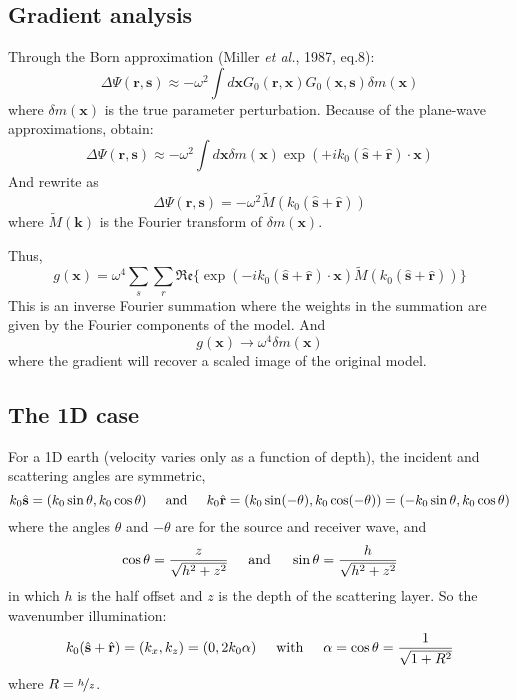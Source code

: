 \documentclass{article}
\newcommand{\mbf}[1]{\mathbf{#1}}
\newcommand{\myRe}{\mathfrak{Re}}
\newcommand{\etal}{\textit{et al.}}
\begin{document}
\subsection{Gradient analysis}
Through the Born approximation (Miller \etal, 1987, eq.8):
\[ \Delta\Psi(\mbf r,\mbf s)\approx-\omega^2\int d\mbf xG_0(\mbf r,\mbf x)G_0(\mbf x,\mbf s)\delta m(\mbf x) \]
where $\delta m(\mbf x)$ is the true parameter perturbation. Because of the plane-wave approximations, obtain:
\[ \Delta\Psi(\mbf r,\mbf s)\approx-\omega^2\int d\mbf x\delta m(\mbf x)\exp(+ik_0(\hat{\mbf s}+\hat{\mbf r})\cdot\mbf x) \]
And rewrite as
\[ \Delta\Psi(\mbf r,\mbf s)=-\omega^2\tilde{M}(k_0(\hat{\mbf s}+\hat{\mbf r})) \]
where $\tilde{M}(\mbf k)$ is the Fourier transform of $\delta m(\mbf x)$.\par
Thus,
\[ g(\mbf x)=\omega^4\sum_s\sum_r\myRe\{\exp(-ik_0(\hat{\mbf s}+\hat{\mbf r})\cdot\mbf x)\tilde{M}(k_0(\hat{\mbf s}+\hat{\mbf r}))\} \]
This is an inverse Fourier summation where the weights in the summation are given by the Fourier components of the model. And
\[ g(\mbf x)\rightarrow\omega^4\delta m(\mbf x) \]
where the gradient will recover a scaled image of the original model.\par
\subsection{The 1D case}
For a 1D earth (velocity varies only as a function of depth), the incident and scattering angles are symmetric,
\[ k_0\hat{\mbf s}=(k_0\sin\theta,k_0\cos\theta) \text{\hspace{5mm}and\hspace{5mm}} k_0\hat{\mbf r}=(k_0\sin(-\theta),k_0\cos(-\theta))=(-k_0\sin\theta,k_0\cos\theta) \]
where the angles $\theta$ and $-\theta$ are for the source and receiver wave, and
\[ \cos\theta=\frac{z}{\sqrt{h^2+z^2}} \text{\hspace{5mm}and\hspace{5mm}} \sin\theta=\frac{h}{\sqrt{h^2+z^2}} \]
in which $h$ is the half offset and $z$ is the depth of the scattering layer. So the wavenumber illumination:
\[ k_0(\hat{\mbf s}+\hat{\mbf r})=(k_x,k_z)=(0,2k_0\alpha) \text{\hspace{5mm}with\hspace{5mm}} \alpha=\cos\theta=\frac{1}{\sqrt{1+R^2}} \]
where $R=\nicefrac{h}{z}$.\par
\end{document}
